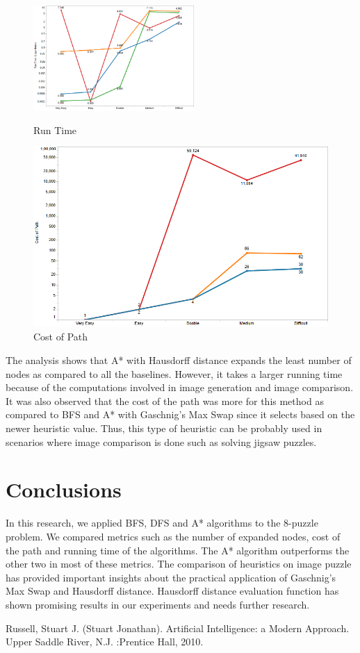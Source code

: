 \documentclass{svproc}
\begin{document}
\setlength{\intextsep}{5pt}
\begin{figure}
	\centering
	\begin{minipage}[b]{0.47\textwidth}
		\includegraphics[width=\textwidth, height=4cm]{Images/RunningTime.png}
		\caption{Run Time}
		\label{fig:time}
	\end{minipage}
	\begin{minipage}[b]{0.47\textwidth}
		\includegraphics[width=\textwidth]{Images/costofpath.png}
		\caption{Cost of Path}
		\label{fig:cost}
	\end{minipage}\hfill
\end{figure}

\noindent  The analysis shows that A* with Hausdorff distance expands the least number of nodes as compared to all the baselines. However, it takes a larger running time because of the computations involved in image generation and image comparison. It was also observed that the cost of the path was more for this method as compared to BFS and A* with Gaschnig's Max Swap since it selects based on the newer heuristic value. Thus, this type of heuristic can be probably used in scenarios where image comparison is done such as solving jigsaw puzzles. \\

\section{Conclusions}
In this research, we applied BFS, DFS and A* algorithms to the 8-puzzle problem. We compared metrics such as the number of expanded nodes, cost of the path and running time of the algorithms. The A* algorithm outperforms the other two in most of these metrics. The comparison of heuristics on image puzzle has provided important insights about the practical application of Gaschnig's Max Swap and Hausdorff distance. Hausdorff distance evaluation function has shown promising results in our experiments and needs further research.

\begin{thebibliography}{6}
%

Russell, Stuart J. (Stuart Jonathan). Artificial Intelligence: a Modern Approach. Upper Saddle River, N.J.       :Prentice Hall, 2010.


\end{thebibliography}
\end{document}
